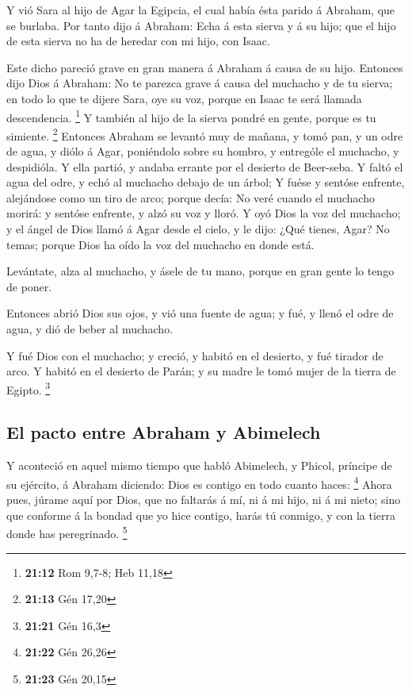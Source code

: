  Y vió Sara al hijo de Agar la Egipcia, el cual había ésta
parido á Abraham, que se burlaba.  Por tanto dijo á
Abraham: Echa á esta sierva y á su hijo; que el hijo de esta sierva no
ha de heredar con mi hijo, con Isaac.

 Este dicho pareció grave en gran manera á Abraham á causa
de su hijo.  Entonces dijo Dios á Abraham: No te parezca
grave á causa del muchacho y de tu sierva; en todo lo que te dijere
Sara, oye su voz, porque en Isaac te será llamada descendencia.
\footnote{\textbf{21:12} Rom 9,7-8; Heb 11,18}  Y también
al hijo de la sierva pondré en gente, porque es tu simiente. \footnote{\textbf{21:13}
  Gén 17,20}  Entonces Abraham se levantó muy de mañana, y
tomó pan, y un odre de agua, y diólo á Agar, poniéndolo sobre su hombro,
y entrególe el muchacho, y despidióla. Y ella partió, y andaba errante
por el desierto de Beer-seba.  Y faltó el agua del odre, y
echó al muchacho debajo de un árbol;  Y fuése y sentóse
enfrente, alejándose como un tiro de arco; porque decía: No veré cuando
el muchacho morirá: y sentóse enfrente, y alzó su voz y lloró.
 Y oyó Dios la voz del muchacho; y el ángel de Dios llamó á
Agar desde el cielo, y le dijo: ¿Qué tienes, Agar? No temas; porque Dios
ha oído la voz del muchacho en donde está.

 Levántate, alza al muchacho, y ásele de tu mano, porque en
gran gente lo tengo de poner.

 Entonces abrió Dios sus ojos, y vió una fuente de agua; y
fué, y llenó el odre de agua, y dió de beber al muchacho.

 Y fué Dios con el muchacho; y creció, y habitó en el
desierto, y fué tirador de arco.  Y habitó en el desierto
de Parán; y su madre le tomó mujer de la tierra de Egipto. \footnote{\textbf{21:21}
  Gén 16,3}

\hypertarget{el-pacto-entre-abraham-y-abimelech}{%
\subsection{El pacto entre Abraham y
Abimelech}\label{el-pacto-entre-abraham-y-abimelech}}

 Y aconteció en aquel mismo tiempo que habló Abimelech, y
Phicol, príncipe de su ejército, á Abraham diciendo: Dios es contigo en
todo cuanto haces: \footnote{\textbf{21:22} Gén 26,26} 
Ahora pues, júrame aquí por Dios, que no faltarás á mí, ni á mi hijo, ni
á mi nieto; sino que conforme á la bondad que yo hice contigo, harás tú
conmigo, y con la tierra donde has peregrinado. \footnote{\textbf{21:23}
  Gén 20,15}

